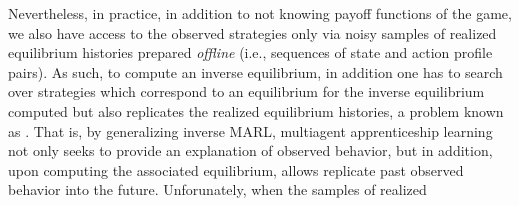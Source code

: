 
Nevertheless, in practice, in addition to not knowing payoff functions of the game, we also have access to the observed strategies only via noisy samples of realized equilibrium histories prepared \emph{offline} (i.e., sequences of state and action profile pairs). As such, to compute an inverse equilibrium, in addition one has to search over strategies which correspond to an equilibrium for the inverse equilibrium computed but also replicates the realized equilibrium histories, a problem known as  \citep{abbeel2004apprenticeship, yang2020inferring}. That is, by generalizing inverse MARL, multiagent apprenticeship learning not only seeks to provide an explanation of observed behavior, but in addition, upon computing the associated equilibrium, allows replicate past observed behavior into the future.  Unforunately, when the samples of realized  
\fi

